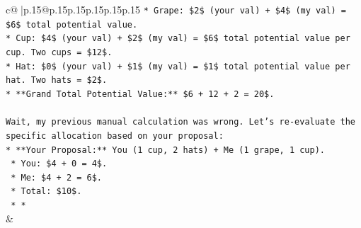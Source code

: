 \documentclass{article}
\begin{document}
{\begin{supertabular}{c@{$\;$}|p{.15\linewidth}@{}p{.15\linewidth}p{.15\linewidth}p{.15\linewidth}p{.15\linewidth}p{.15\linewidth}}
{{{\texttt{*   Grape: \$2\$ (your val) + \$4\$ (my val) = \$6\$ total potential value.} \\
\texttt{*   Cup: \$4\$ (your val) + \$2\$ (my val) = \$6\$ total potential value per cup. Two cups = \$12\$.} \\
\texttt{*   Hat: \$0\$ (your val) + \$1\$ (my val) = \$1\$ total potential value per hat. Two hats = \$2\$.} \\
\texttt{*   **Grand Total Potential Value:** \$6 + 12 + 2 = 20\$.} \\
\\ 
\texttt{Wait, my previous manual calculation was wrong. Let's re{-}evaluate the specific allocation based on your proposal:} \\
\texttt{*   **Your Proposal:** You (1 cup, 2 hats) + Me (1 grape, 1 cup).} \\
\texttt{    *   You: \$4 + 0 = 4\$.} \\
\texttt{    *   Me: \$4 + 2 = 6\$.} \\
\texttt{    *   Total: \$10\$.} \\
\texttt{    *   *} \\
            }
        }
    }
    & \\ \\


\end{supertabular}}
\end{document}
